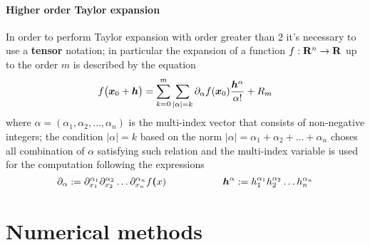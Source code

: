 	\paragraph{Higher order Taylor expansion} In order to perform Taylor expansion with order greater than 2 it's necessary to use a \textbf{tensor} notation; in particular the expansion of a function $f:\mathbf{R}^n\rightarrow \mathbf{R}$ up to the order $m$ is described by the equation
	\begin{equation}
		f\big(\boldsymbol{x}_0 + \boldsymbol{h}\big) = \sum_{k=0}^{m} \sum_{|\alpha|=k} \partial_\alpha f(\boldsymbol{x}_0) \frac{\boldsymbol{h}^\alpha}{\alpha!} + R_m
	\end{equation}
	where $\alpha = (\alpha_1,\alpha_2,\dots,\alpha_n)$ is the multi-index vector that consists of non-negative integers; the condition $|\alpha|=k$ based on the norm $|\alpha| = \alpha_1+\alpha_2+\dots + \alpha_n$ choses all combination of $\alpha$ satisfying such relation and the multi-index variable is used for the computation following the expressions
	\[ \partial_\alpha := \partial_{x_1}^{\alpha_1} \partial_{x_2}^{\alpha_2} \dots \partial_{x_n}^{\alpha_n} f\boldsymbol{(}x) \hspace{2cm} \boldsymbol{h}^\alpha := h_1^{\alpha_1} h_2^{\alpha_2} \dots h_n^{\alpha_n} \]
	
\section{Numerical methods}
